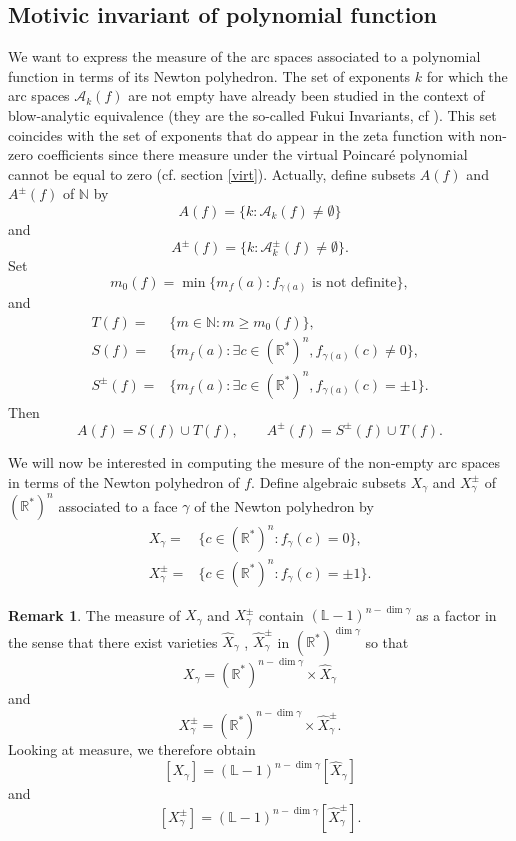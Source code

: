 \documentclass[12pt,a4paper,leqno]{amsart}
\theoremstyle{definition}
\newtheorem{rem}[thm]{Remark}
\begin{document}
\subsection{Motivic invariant of polynomial function}\label{poly}
We want to express the measure of the arc spaces associated to a
polynomial function in terms of its Newton polyhedron. The set of
exponents $k$ for which the arc spaces $\mathcal A_k(f)$ are not empty
have already been studied in the context of blow-analytic
equivalence (they are the so-called Fukui Invariants, cf
\cite{Fukui}). This set coincides with the set of exponents that do appear in the
zeta function with non-zero coefficients since there measure under the
virtual Poincar\'e polynomial cannot be equal to zero
(cf. section \ref{virt}). Actually, define subsets $A(f)$ and $A^\pm(f)$ of ${\mathbb{N}}$ by 
$$
A(f)=\{k:\mathcal A_k(f)\ne\emptyset\}$$
and
$$
A^\pm(f)=\{k:\mathcal A_k^\pm(f)\ne\emptyset\}. 
$$ 
Set 
$$m_0(f)=\min\{m_f(a):f_{\gamma(a)} \textrm{ is not definite}\},$$
and
\begin{align*}
T(f)=&\{m\in{\mathbb{N}}:m\ge m_0(f)\},\\
S(f)=&\{m_f(a):\exists c\in({\mathbb{R}}^*)^n, f_{\gamma(a)}(c)\ne0\},\\
S^\pm(f)=&\{m_f(a):\exists c\in({\mathbb{R}}^*)^n, f_{\gamma(a)}(c)=\pm1\}.
\end{align*}
Then 
$$
A(f)=S(f)\cup T(f),\qquad
A^\pm(f)=S^\pm(f)\cup T(f).
$$

We will now be interested in computing the mesure
of the non-empty arc spaces in terms of the Newton polyhedron of
$f$. Define algebraic subsets $X_\gamma$ and $X^\pm_\gamma$ of
$({\mathbb{R}}^*)^n$ associated to a face $\gamma$ of the Newton polyhedron by
\begin{align*}
X_\gamma=&\{c\in({\mathbb{R}}^*)^n:f_\gamma(c)=0\},\\
X^{\pm}_\gamma=&\{c\in({\mathbb{R}}^*)^n:f_\gamma(c)=\pm1\}.
\end{align*}

\begin{rem} The measure of $X_\gamma$ and $X^\pm_\gamma$
  contain $({\mathbb{L}}-1)^{n-\dim\gamma}$ as a factor in the sense that there exist varieties 
$\widehat{X}_\gamma$ , $\widehat{X}^{\pm}_\gamma$ 
in $({\mathbb{R}}^*)^{\dim\gamma}$ so that 
$$
X_\gamma=({\mathbb{R}}^*)^{n-\dim\gamma}\times\widehat{X}_\gamma$$
and
$$
X^{\pm}_\gamma=({\mathbb{R}}^*)^{n-\dim\gamma}\times\widehat{X}^{\pm}_\gamma. 
$$
Looking at measure, we therefore obtain  
$$
[X_\gamma]=({\mathbb{L}}-1)^{n-\dim\gamma}[\widehat{X}_\gamma]$$
and
$$
[X^{\pm}_\gamma]=({\mathbb{L}}-1)^{n-\dim\gamma}[\widehat{X}^{\pm}_\gamma]. 
$$
\end{rem}
\end{document}

